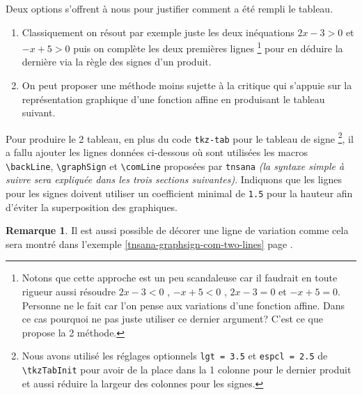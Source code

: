 \documentclass[12pt,a4paper]{article}
\newcommand\env[1]{\texttt{#1}}
\newcommand\macro[1]{\env{\textbackslash{}#1}}
\theoremstyle{definition}
\newtheorem*{remark}{Remarque}
\begin{document}
Deux options s'offrent à nous pour justifier comment a été rempli le tableau.

\begin{enumerate}
    \item Classiquement on résout par exemple juste les deux inéquations $2 x - 3 > 0$ et $-x + 5 > 0$ puis on complète les deux premières lignes
    \footnote{
        Notons que cette approche est un peu scandaleuse car il faudrait en toute rigueur aussi résoudre
        $2 x - 3 < 0$ , $-x + 5 < 0$ , $2 x - 3 = 0$ et $-x + 5 = 0$.
        Personne ne le fait car l'on pense aux variations d'une fonction affine. Dans ce cas pourquoi ne pas juste utiliser ce dernier argument?
        C'est ce que propose la 2\ieme{} méthode.
    }
    pour en déduire la dernière via la règle des signes d'un produit.

    \item On peut proposer une méthode moins sujette à la critique qui s'appuie sur la représentation graphique d'une fonction affine en produisant le tableau suivant.
\end{enumerate}

\begin{center}
	
\end{center}


Pour produire le 2\ieme{} tableau, en plus du code \verb#tkz-tab# pour le tableau de signe
\footnote{
	Nous avons utilisé les réglages optionnels
	\texttt{lgt = 3.5} et \texttt{espcl = 2.5} de \macro{tkzTabInit}
	pour avoir de la place dans la 1\iere{} colonne pour le dernier produit
	et aussi réduire la largeur des colonnes pour les signes.
},
il a fallu ajouter les lignes données ci-dessous où sont utilisées les macros     \macro{backLine}, \macro{graphSign} et \macro{comLine} proposées par \verb+tnsana+ \emph{(la syntaxe simple à suivre sera expliquée dans les trois sections suivantes)}.
	Indiquons que les lignes pour les signes doivent utiliser un coefficient minimal de \texttt{1.5} pour la hauteur afin d'éviter la superposition des graphiques.

\medskip



\begin{remark}
	Il est aussi possible de décorer une ligne de variation comme cela sera montré dans l'exemple \ref{tnsana-graphsign-com-two-lines} page \pageref{tnsana-graphsign-com-two-lines}. 
\end{remark}
\end{document}

